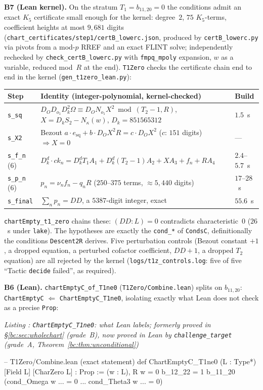 \documentclass[a4paper,11pt]{article}
\newcounter{leanlisting}
\newenvironment{leanlisting}[2]{%
  \refstepcounter{leanlisting}\label{#2}%
  \begin{center}\textit{\small Listing \theleanlisting: #1}\end{center}%
  \Verbatim[breaklines=true,breakanywhere=true,fontsize=\footnotesize,frame=single,framesep=4pt,rulecolor=\color{gray!50},fillcolor=\color{gray!5}]%
}{%
  \endVerbatim%
}
\theoremstyle{plain}
\theoremstyle{definition}
\theoremstyle{remark}
\begin{document}
\textbf{B7 (Lean kernel).} On the stratum $T_1=b_{11,20}=0$ the conditions admit an exact $K_5$ certificate small enough for the kernel: degree~$2$, $75$ $K_5$-terms, coefficient heights at most $9{,}681$ digits (\texttt{chart\_certificates/step1/certB\_lowerc.json}, produced by \texttt{certB\_lowerc.py} via pivots from a mod-$p$ RREF and an exact FLINT solve; independently rechecked by \texttt{check\_certB\_lowerc.py} with \texttt{fmpq\_mpoly} expansion, $w$ as a variable, reduced mod~$R$ at the end). \texttt{T1Zero} checks the certificate chain end to end in the kernel (\texttt{gen\_t1zero\_lean.py}):
{\footnotesize
\begin{center}
\begin{tabular}{lll}
Step & Identity (integer-polynomial, kernel-checked) & Build \\ \midrule
\texttt{s\_sq} & $D_O D_{o_1} D_k^2\Omega\equiv D_O N_{o_1}X^2\bmod(T_2-1,R)$, $X=D_kS_2-N_\kappa(w)$, $D_k=851565312$ & $1.5$~s \\
\texttt{s\_X2} & Bezout $a\cdot e_{\mathrm{sq}}+b\cdot D_OX^2R=c\cdot D_OX^2$ ($c$: $151$ digits) $\Rightarrow X=0$ & --- \\
\texttt{s\_f\_n} (6) & $D_k^d\cdot ck_n=D_k^dT_1A_1+D_k^d(T_2-1)A_2+XA_3+f_n+RA_4$ & $2.4$--$5.7$~s \\
\texttt{s\_p\_n} (6) & $p_n=\nu_n f_n-q_nR$ ($250$--$375$ terms, $\approx5{,}440$ digits) & $17$--$28$~s \\
\texttt{s\_final} & $\sum_n p_n=DD$, a $5387$-digit integer, exact & $55.6$~s \\
\end{tabular}
\end{center}
}
\texttt{chartEmpty\_t1\_zero} chains these: $(DD:L)=0$ contradicts characteristic~$0$ ($26$~s under \texttt{lake}). The hypotheses are exactly the \texttt{cond\_*} of \texttt{CondsC}, definitionally the conditions \texttt{Descent2R} derives. Five perturbation controls (Bezout constant $+1$, a dropped equation, a perturbed cofactor coefficient, $DD+1$, a dropped $T_2$ equation) are all rejected by the kernel (\texttt{logs/t1z\_controls.log}: five of five ``Tactic \texttt{decide} failed'', as required).

\textbf{B6 (Lean).} \texttt{chartEmptyC\_of\_T1ne0} (\texttt{T1Zero/Combine.lean}) splits on $b_{11,20}$: \texttt{ChartEmptyC} $\Leftarrow$ \texttt{ChartEmptyC\_T1ne0}, isolating exactly what Lean does not check as a precise \texttt{Prop}:
\begin{leanlisting}{\texttt{ChartEmptyC\_T1ne0}: what Lean labels; formerly proved in \S\ref{bc:sec:wholechart} (grade~B), now proved in Lean by \texttt{challenge\_target} (grade~A, Theorem~\ref{bc:thm:unconditional})}{bc:lst:chartempty}
-- T1Zero/Combine.lean (exact statement)
def ChartEmptyC_T1ne0 (L : Type*) [Field L] [CharZero L] : Prop :=
  \forall (w : L), R w = 0 \to b_12_22 = 1 \to b_11_20  \to
    \lnot (cond_Omega w ... = 0 \land ... \land cond_Theta3 w ... = 0)
\end{leanlisting}
\end{document}
